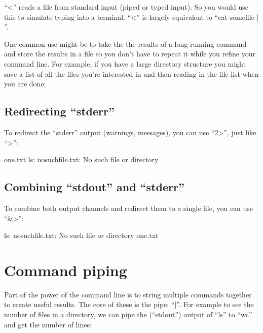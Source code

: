 ``<'' reads a file from standard input (piped or typed input).  So you would use
this to simulate typing into a terminal. ``<'' is largely equivalent to ``cat
somefile | ''.

One common use might be to take the the results of a long running command and
store the results in a file so you don't have to repeat it while you refine your
command line. For example, if you have a large directory structure you might
save a list of all the files you're interested in and then reading in the file
list when you are done:

\begin{prompt}
\end{prompt}

\subsection{Redirecting ``stderr''}

To redirect the ``stderr'' output (warnings, messages), you can use ``2>'', just
like ``>'':

\begin{prompt}
one.txt
ls: nosuchfile.txt: No such file or directory
\end{prompt}

\subsection{Combining ``stdout'' and ``stderr''}

To combine both output channels and redirect them to a single file, you can use
``&>'':

\begin{prompt}
ls: nosuchfile.txt: No such file or directory
one.txt
\end{prompt}

\section{Command piping}

Part of the power of the command line is to string multiple commands together to
create useful results. The core of these is the pipe: ``|''. For example to see
the number of files in a directory, we can pipe the (``stdout'') output of
``ls'' to ``wc'' and get the number of lines:

